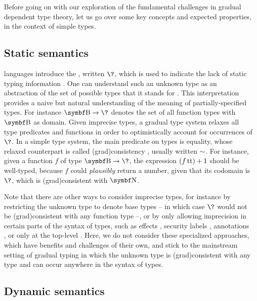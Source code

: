Before going on with our exploration of the fundamental challenges in gradual dependent type
theory, let us go over some key concepts and expected properties,
in the context of simple types.

\subsection{Static semantics}

 languages introduce the , written $\?$,
which is used to indicate the lack of static typing information .
One can understand such an unknown type as an abstraction of the
set of possible types that it stands for .
This interpretation provides a naive but natural understanding of the meaning of
partially-specified types. For instance $\Bool \to \?$ denotes the set of all function types
with $\Bool$ as domain.
Given imprecise types, a gradual type system relaxes all type predicates and functions in order
to optimistically account for occurrences of $\?$.
In a simple type system, the main predicate on types is equality, whose relaxed counterpart is called \intro(grad){consistency}%
,
usually written $\sim$.
For instance, given a function $f$ of type $\Bool \to \?$, the expression $(f \operatorname{tt}) + 1$
should be well-typed, because $f$ could \emph{plausibly} return a number,
given that its codomain is $\?$, which is \kl(grad){consistent} with $\Nat$.

Note that there are other ways to consider imprecise types, for instance by restricting the
unknown type to denote base types – in which case $\?$ would not be \kl(grad){consistent} with any
function type –, or by only allowing imprecision in certain parts of the syntax of types,
such as effects , security labels
, annotations ,
or only at the top-level .
Here, we do not consider these specialized approaches, which have benefits and challenges
of their own, and stick to the mainstream setting of gradual typing
in which the unknown type is \kl(grad){consistent} with any type and can occur
anywhere in the syntax of types.

\subsection{Dynamic semantics}

